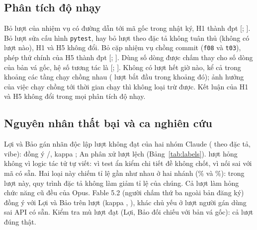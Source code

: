 \subsection{Phân tích độ nhạy}

Bỏ \NumResSensUrlRuns{} lượt của nhiệm vụ có đường dẫn tới mã gốc trong nhật ký, H1 thành
\NumResSensUrlEstPp{} đpt [\NumResSensUrlLowPp{}; \NumResSensUrlHighPp{}]. Bỏ \NumResSensPytestRuns{} lượt
sửa cấu hình \texttt{pytest}, hay bỏ lượt theo đặc tả không tuân thủ (không có lượt nào), H1 và H5 không
đổi. Bỏ cặp nhiệm vụ chồng commit (\texttt{f08} và \texttt{t03}), phép thử chính của H5 thành
\NumResSensOverlapEstPp{} đpt [\NumResSensOverlapLowPp{}; \NumResSensOverlapHighPp{}]. Dùng số dòng được
chấm thay cho số dòng của bản vá gốc, hệ số tương tác là \NumResHFiveGradedCoef{}
[\NumResHFiveGradedLow{}; \NumResHFiveGradedHigh{}]. Không có lượt hết giờ nào, kể cả trong khoảng các
tầng chạy chồng nhau (\NumResConcurrentWindowRuns{} lượt bắt đầu trong khoảng đó); ảnh hưởng của việc chạy
chồng tới thời gian chạy thì không loại trừ được. Kết luận của H1 và H5 không đổi trong mọi phân tích độ nhạy.

\subsection{Nguyên nhân thất bại và ca nghiên cứu}

Lợi và Bảo gán nhãn độc lập \NumLabRuns{} lượt không đạt của hai nhóm Claude (\NumLabSpecRuns{} theo
đặc tả, \NumLabVibeRuns{} vibe): đồng ý \NumLabAgree{}/\NumLabRuns{}, kappa \NumLabKappa{}; An phân xử
\NumLabAdjudicated{} lượt lệch (Bảng~\ref{tab:labels}). \NumLabOutside{} lượt hỏng không vì logic tác tử tự
viết: \NumLabDeBaiThieuTotal{} vì test ẩn kiểm chi tiết đề không chốt, \NumLabSaiApiCoSanTotal{} vì nối sai
với mã có sẵn. Hai loại này chiếm tỉ lệ gần như nhau ở hai nhánh
(\NumLabOutsideSpecPct{}\% và \NumLabOutsideVibePct{}\%): trong \NumLabRuns{} lượt này, quy trình đặc tả không làm giảm tỉ lệ của chúng. Cả
\NumLabHongChucNangCuTotal{} lượt làm hỏng chức năng cũ đều của Opus. Fable 5.2 (người chấm thứ ba ngoài bản
đăng ký) đồng ý với Lợi \NumLabFableAgreeLoi{} và Bảo \NumLabFableAgreeBao{} trên \NumLabRuns{} lượt (kappa
\NumLabFableKappaLoi{}, \NumLabFableKappaBao{}), khác chủ yếu ở lượt người gán dùng sai API có sẵn. Kiểm tra mù \NumPassCheckRuns{} lượt
đạt (Lợi, Bảo đối chiếu với bản vá gốc): cả \NumPassCheckCorrect{} lượt đúng thật.

\begin{table}[H]
\centering\small
\caption{Nguyên nhân thất bại: nhãn cuối của Lợi và Bảo; cột cuối là nhãn của Fable 5.2}
\label{tab:labels}

\end{table}


